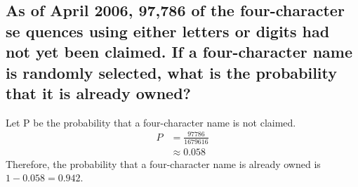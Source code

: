 \subsection{As of April 2006, 97,786 of the four-character se    quences using either letters or digits had not yet been claimed. If a four-character name is randomly selected, what is the probability that it is already owned?}

Let P be the probability that a four-character name is not claimed.
\begin{equation}
    \begin{split}
        P & = \frac{97786}{1679616} \\
          & \approx 0.058
    \end{split}
\end{equation}
Therefore, the probability that a four-character name is already owned is \(1 - 0.058 = 0.942\).